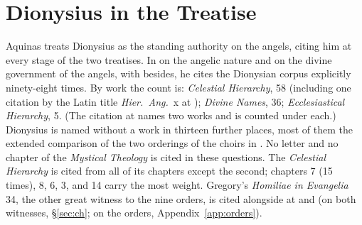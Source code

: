 \section{Dionysius in the Treatise}\label{app:ch-in-summa}

Aquinas treats Dionysius as the standing authority on the angels,
citing him at every stage of the two treatises. In  on
the angelic nature and  on the divine government of
the angels, with  besides, he cites the Dionysian
corpus explicitly ninety-eight times. By work the count is: \emph{Celestial Hierarchy},
58 (including one citation by the Latin title \emph{Hier.~Ang.}~x at
); \emph{Divine Names}, 36; \emph{Ecclesiastical
Hierarchy}, 5. (The citation at  names two works
and is counted under each.) Dionysius is named without a work in
thirteen further places, most of them the extended comparison of the
two orderings of the choirs in . No letter and no
chapter of the \emph{Mystical Theology} is cited in these questions.
The \emph{Celestial Hierarchy} is cited from all of its chapters except
the second; chapters 7 (15 times), 8, 6, 3, and 14 carry the most
weight. Gregory's \emph{Homiliae in Evangelia} 34, the other great
witness to the nine orders, is cited alongside at 
and  (on both witnesses, \S\ref{sec:ch}; on the
orders, Appendix~\ref{app:orders}).

